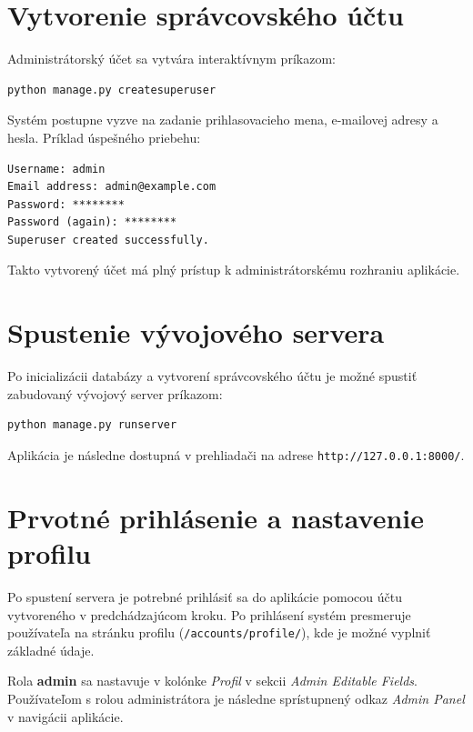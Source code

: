 \section{Vytvorenie správcovského účtu}\label{sec:superuser}

Administrátorský účet sa vytvára interaktívnym príkazom:

\begin{verbatim}
python manage.py createsuperuser
\end{verbatim}

Systém postupne vyzve na zadanie prihlasovacieho mena, e-mailovej adresy
a hesla. Príklad úspešného priebehu:

\begin{verbatim}
Username: admin
Email address: admin@example.com
Password: ********
Password (again): ********
Superuser created successfully.
\end{verbatim}

Takto vytvorený účet má plný prístup k administrátorskému rozhraniu
aplikácie.

\section{Spustenie vývojového servera}\label{sec:runserver}

Po inicializácii databázy a vytvorení správcovského účtu je možné spustiť
zabudovaný vývojový server príkazom:

\begin{verbatim}
python manage.py runserver
\end{verbatim}

Aplikácia je následne dostupná v prehliadači na adrese
\texttt{http://127.0.0.1:8000/}.

\section{Prvotné prihlásenie a nastavenie profilu}\label{sec:first.login}

Po spustení servera je potrebné prihlásiť sa do aplikácie pomocou účtu
vytvoreného v predchádzajúcom kroku. Po prihlásení systém presmeruje
používateľa na stránku profilu (\texttt{/accounts/profile/}), kde je možné
vyplniť základné údaje.

Rola \textbf{admin} sa nastavuje v kolónke \emph{Profil} v sekcii \emph{Admin Editable Fields}.
Používateľom s rolou administrátora je následne sprístupnený odkaz
\emph{Admin Panel} v navigácii aplikácie.

